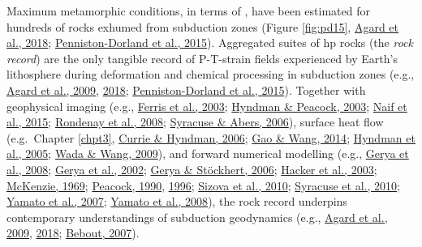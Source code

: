 Maximum metamorphic conditions, in terms of , have been estimated for hundreds of  rocks exhumed from subduction zones (Figure \ref{fig:pd15}, \protect\hyperlink{ref-agard2018}{Agard et al., 2018}; \protect\hyperlink{ref-penniston2015}{Penniston-Dorland et al., 2015}). Aggregated suites of \gls{hp} rocks (the \emph{rock record}) are the only tangible record of P-T-strain fields experienced by Earth's lithosphere during deformation and chemical processing in subduction zones (e.g., \protect\hyperlink{ref-agard2009}{Agard et al., 2009}, \protect\hyperlink{ref-agard2018}{2018}; \protect\hyperlink{ref-penniston2015}{Penniston-Dorland et al., 2015}). Together with geophysical imaging (e.g., \protect\hyperlink{ref-ferris2003}{Ferris et al., 2003}; \protect\hyperlink{ref-hyndman2003}{Hyndman \& Peacock, 2003}; \protect\hyperlink{ref-naif2015}{Naif et al., 2015}; \protect\hyperlink{ref-rondenay2008}{Rondenay et al., 2008}; \protect\hyperlink{ref-syracuse2006}{Syracuse \& Abers, 2006}), surface heat flow (e.g.~Chapter \ref{chpt3}, \protect\hyperlink{ref-currie2006}{Currie \& Hyndman, 2006}; \protect\hyperlink{ref-gao2014}{Gao \& Wang, 2014}; \protect\hyperlink{ref-hyndman2005}{Hyndman et al., 2005}; \protect\hyperlink{ref-wada2009}{Wada \& Wang, 2009}), and forward numerical modelling (e.g., \protect\hyperlink{ref-gerya2008}{Gerya et al., 2008}; \protect\hyperlink{ref-gerya2002}{Gerya et al., 2002}; \protect\hyperlink{ref-gerya2006}{Gerya \& Stöckhert, 2006}; \protect\hyperlink{ref-hacker2003}{Hacker et al., 2003}; \protect\hyperlink{ref-mckenzie1969}{McKenzie, 1969}; \protect\hyperlink{ref-peacock1990}{Peacock, 1990}, \protect\hyperlink{ref-peacock1996}{1996}; \protect\hyperlink{ref-sizova2010}{Sizova et al., 2010}; \protect\hyperlink{ref-syracuse2010}{Syracuse et al., 2010}; \protect\hyperlink{ref-yamato2007}{Yamato et al., 2007}; \protect\hyperlink{ref-yamato2008}{Yamato et al., 2008}), the rock record underpins contemporary understandings of subduction geodynamics (e.g., \protect\hyperlink{ref-agard2009}{Agard et al., 2009}, \protect\hyperlink{ref-agard2018}{2018}; \protect\hyperlink{ref-bebout2007}{Bebout, 2007}).


